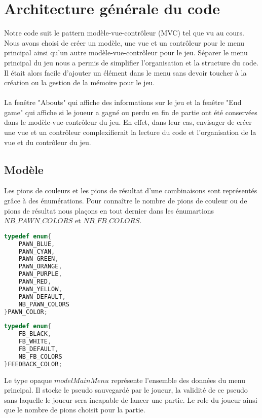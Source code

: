 
\section{Architecture générale du code}

Notre code suit le pattern modèle-vue-contrôleur (MVC) tel que vu au cours. Nous avons choisi de créer un modèle, une vue et un contrôleur pour le menu principal ainsi qu'un autre modèle-vue-contrôleur pour le jeu. Séparer le menu principal du jeu nous a permis de simplifier l'organisation et la structure du code. Il était alors facile d'ajouter un élément dans le menu sans devoir toucher à la création ou la gestion de la mémoire pour le jeu.
\\\\
La fenêtre "Abouts" qui affiche des informations sur le jeu et la fenêtre "End game" qui affiche si le joueur a gagné ou perdu en fin de partie ont été conservées dans le modèle-vue-contrôleur du jeu. En effet, dans leur cas, envisager de créer une vue et un contrôleur complexifierait la lecture du code et l'organisation de la vue et du contrôleur du jeu.

\subsection{Modèle}

Les pions de couleurs et les pions de résultat d'une combinaisons sont représentés grâce à des énumérations. Pour connaître le nombre de pions de couleur ou de pions de résultat nous plaçons en tout dernier dans les énumartions $NB\_PAWN\_COLORS$ et $NB\_FB\_COLORS$.
\begin{lstlisting}[language=C]
typedef enum{
    PAWN_BLUE,
    PAWN_CYAN,
    PAWN_GREEN,
    PAWN_ORANGE,
    PAWN_PURPLE,
    PAWN_RED,
    PAWN_YELLOW,
    PAWN_DEFAULT,
    NB_PAWN_COLORS
}PAWN_COLOR;
\end{lstlisting}

\begin{lstlisting}[language=C]
typedef enum{
    FB_BLACK,
    FB_WHITE,
    FB_DEFAULT,
    NB_FB_COLORS
}FEEDBACK_COLOR;
\end{lstlisting}

Le type opaque $modelMainMenu$ représente l'ensemble des données du menu principal. Il stocke le pseudo sauvegardé par le joueur, la validité de ce pseudo sans laquelle le joueur sera incapable de lancer une partie. Le role du joueur ainsi que le nombre de pions choisit pour la partie.

